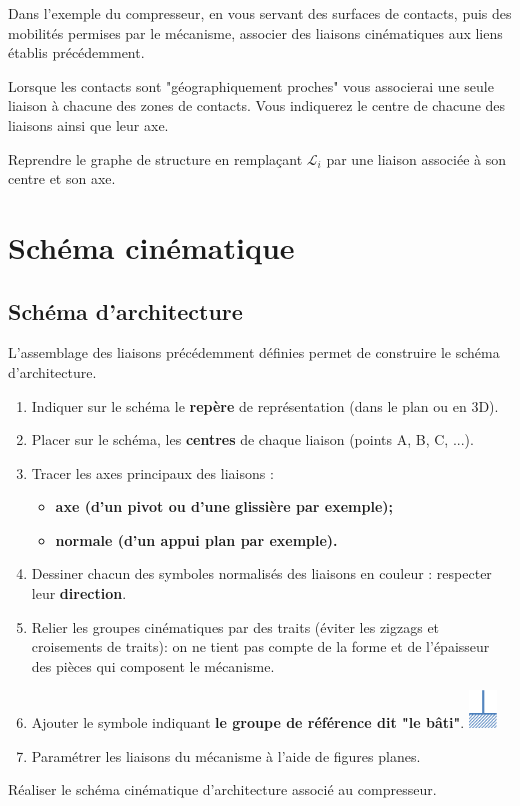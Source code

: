 \documentclass[10pt,oneside]{article}
\begin{document}
\begin{exemple}
Dans l'exemple du compresseur, en vous servant des surfaces de contacts, puis des mobilités permises par le mécanisme, associer des liaisons cinématiques aux liens établis précédemment. 

Lorsque les contacts sont "géographiquement proches" vous associerai une seule liaison à chacune des zones de contacts. Vous indiquerez le centre de chacune des liaisons ainsi que leur axe. 


Reprendre le graphe de structure en remplaçant $\mathcal{L}_i$ par une liaison associée à son centre et son axe. 
\end{exemple}



\section{Schéma cinématique}

\subsection{Schéma d'architecture}
L'assemblage des liaisons précédemment définies permet de construire le schéma d'architecture. 

\begin{methode}
\begin{enumerate}
\item Indiquer sur le schéma le \textbf{repère} de représentation (dans le plan ou en 3D). 
\item Placer sur le schéma, les \textbf{centres} de chaque liaison (points A, B, C, ...).
\item Tracer les axes principaux des liaisons : 
\begin{itemize}
\item \textbf{axe (d'un pivot ou d'une glissière par exemple);}
\item \textbf{normale (d'un appui plan par exemple).}
\end{itemize}
\item Dessiner chacun des symboles normalisés des liaisons en couleur : respecter leur \textbf{direction}.
\item Relier les groupes cinématiques par des traits (éviter les zigzags et croisements de traits): on ne tient pas compte de la forme et de l'épaisseur des pièces qui composent le mécanisme.
\item Ajouter le symbole indiquant \textbf{le groupe de référence dit "le bâti"}. \includegraphics[height=1cm]{png/bati}
\item Paramétrer les liaisons du mécanisme à l'aide de figures planes.
\end{enumerate}
\end{methode}
\begin{exemple}

Réaliser le schéma cinématique d'architecture associé au compresseur.

\end{exemple}
\end{document}
